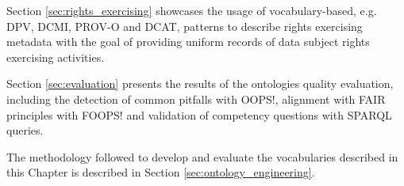 Section \ref{sec:rights_exercising} showcases the usage of vocabulary-based, e.g. DPV, DCMI, PROV-O and DCAT, patterns to describe rights exercising metadata with the goal of providing uniform records of data subject rights exercising activities.

Section \ref{sec:evaluation} presents the results of the ontologies quality evaluation, including the detection of common pitfalls with OOPS!, alignment with FAIR principles with FOOPS! and validation of competency questions with SPARQL queries.

The methodology followed to develop and evaluate the vocabularies described in this Chapter is described in Section \ref{sec:ontology_engineering}.





